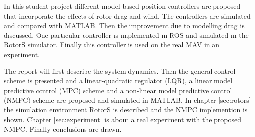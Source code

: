 In this student project different model based position controllers are proposed that incorporate the effects of rotor drag and wind. The controllers are simulated and compared with MATLAB. Then the improvement due to modelling drag is discussed. One particular controller is implemented in ROS and simulated in the RotorS simulator. Finally this controller is used on the real MAV in an experiment.

The report will first describe the system dynamics. Then the general control scheme is presented and a linear-quadratic regulator (LQR), a linear model predictive control (MPC) scheme and a non-linear model predictive control (NMPC) scheme are proposed and simulated in MATLAB. In chapter \ref{sec:rotors} the simulation environment RotorS is described and the NMPC implemention is shown. Chapter \ref{sec:experiment} is about a real experiment with the proposed NMPC. Finally conclusions are drawn.
